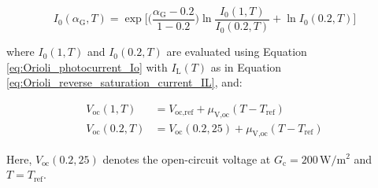 \begin{equation}
    I_{0}(\alpha_{\text{G}}, T) = \exp \Biggl[ \Biggl( \frac{\alpha_{\text{G}} - 0.2}{1 - 0.2} \Biggr) \ln \frac{I_{0}(1, T)}{I_{0}(0.2, T)} + \ln I_{0}(0.2, T) \Biggr]
\end{equation}

\noindent
where \(I_{0}(1,T)\) and \(I_{0}(0.2,T)\) are evaluated using Equation
\ref{eq:Orioli_photocurrent_Io} with \(I_{\text{L}}(T)\) as
in Equation \ref{eq:Orioli_reverse_saturation_current_IL}, and:

\begin{align}
    V_{\text{oc}}(1, T)   &= V_{\text{oc,ref}} + \mu_{\text{V,oc}} (T - T_{\text{ref}})     \\
    V_{\text{oc}}(0.2, T) &= V_{\text{oc}}(0.2,25) + \mu_{\text{V,oc}} (T - T_{\text{ref}})
\end{align}

\noindent
Here, \(V_{\text{oc}}(0.2,25)\) denotes the open-circuit voltage at \(G_{\text{c}} = 200 \, \si{\watt\per\square\meter}\)  and
\(T = T_{\text{ref}}\).
